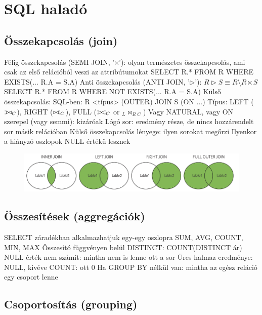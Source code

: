 \documentclass[12pt,a4paper]{article}
\def\ojoin{\setbox0=\hbox{$\bowtie$}%
  \rule[-.02ex]{.25em}{.4pt}\llap{\rule[\ht0]{.25em}{.4pt}}}
\def\leftouterjoin{\mathbin{\ojoin\mkern-5.8mu\bowtie}}
\def\rightouterjoin{\mathbin{\bowtie\mkern-5.8mu\ojoin}}
\def\fullouterjoin{\mathbin{\ojoin\mkern-5.8mu\bowtie\mkern-5.8mu\ojoin}}
\begin{document}
\section{SQL haladó}

\subsection{Összekapcsolás (join)}

\begin{outline}
	\1 Félig összekapcsolás (SEMI JOIN, '$\ltimes$'): olyan természetes összekapcsolás, ami csak az első relációból veszi az attribútumokat
		\2 SELECT R.* FROM R WHERE EXISTS(... R.A = S.A)
	\1 Anti összekapcsolás (ANTI JOIN, '$\rhd$'): $R \rhd S \equiv R \setminus R \ltimes S$
		\2 SELECT R.* FROM R WHERE NOT EXISTS(... R.A = S.A)
	\1 Külső összekapcsolás:
		\2 SQL-ben: R <típus> (OUTER) JOIN S (ON ...)
			\3 Típus: LEFT ($\leftouterjoin_C$), RIGHT ($\rightouterjoin_C$), FULL ($\fullouterjoin_C$ or $ _L\bowtie_{R\;C}$)
			\3 Vagy NATURAL, vagy ON szerepel (vagy semmi): kizáróak
		\2 Lógó sor: eredmény része, de nincs hozzárendelt sor másik relációban
			\3 Külső összekapcsolás lényege: ilyen sorokat megőrzi
			\3 Ilyenkor a hiányzó oszlopok NULL értékű lesznek
\end{outline}

\begin{figure}[h!]
	\centering
	\includegraphics[width=0.7\linewidth]{joins}
\end{figure}

\pagebreak

\subsection{Összesítések (aggregációk)}

\begin{outline}
	\1 SELECT záradékban alkalmazhatjuk egy-egy oszlopra
	\1 SUM, AVG, COUNT, MIN, MAX
	\1 Összesító függvényen belül DISTINCT: COUNT(DISTINCT ár)
	\1 NULL érték nem számít: mintha nem is lenne ott a sor
	\1 Üres halmaz eredménye: NULL, kivéve COUNT: ott 0
	\1 Ha GROUP BY nélkül van: mintha az egész reláció egy csoport lenne
\end{outline}

\subsection{Csoportosítás (grouping)}
\end{document}
